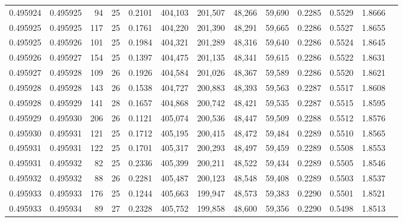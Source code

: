 \begin{tabular}{rrrrrrrrrrrrr}
0.495924 & 0.495925 &  94 &  25 &                                     0.2101 & 404,103 & 201,507 &  48,266 &  59,690 & 0.2285 & 0.5529 & 1.8666 \\
0.495925 & 0.495925 & 117 &  25 &                                     0.1761 & 404,220 & 201,390 &  48,291 &  59,665 & 0.2286 & 0.5527 & 1.8655 \\
0.495925 & 0.495926 & 101 &  25 &                                     0.1984 & 404,321 & 201,289 &  48,316 &  59,640 & 0.2286 & 0.5524 & 1.8645 \\
0.495926 & 0.495927 & 154 &  25 &                                     0.1397 & 404,475 & 201,135 &  48,341 &  59,615 & 0.2286 & 0.5522 & 1.8631 \\
0.495927 & 0.495928 & 109 &  26 &                                     0.1926 & 404,584 & 201,026 &  48,367 &  59,589 & 0.2286 & 0.5520 & 1.8621 \\
0.495928 & 0.495928 & 143 &  26 &                                     0.1538 & 404,727 & 200,883 &  48,393 &  59,563 & 0.2287 & 0.5517 & 1.8608 \\
0.495928 & 0.495929 & 141 &  28 &                                     0.1657 & 404,868 & 200,742 &  48,421 &  59,535 & 0.2287 & 0.5515 & 1.8595 \\
0.495929 & 0.495930 & 206 &  26 &                                     0.1121 & 405,074 & 200,536 &  48,447 &  59,509 & 0.2288 & 0.5512 & 1.8576 \\
0.495930 & 0.495931 & 121 &  25 &                                     0.1712 & 405,195 & 200,415 &  48,472 &  59,484 & 0.2289 & 0.5510 & 1.8565 \\
0.495931 & 0.495931 & 122 &  25 &                                     0.1701 & 405,317 & 200,293 &  48,497 &  59,459 & 0.2289 & 0.5508 & 1.8553 \\
0.495931 & 0.495932 &  82 &  25 &                                     0.2336 & 405,399 & 200,211 &  48,522 &  59,434 & 0.2289 & 0.5505 & 1.8546 \\
0.495932 & 0.495932 &  88 &  26 &                                     0.2281 & 405,487 & 200,123 &  48,548 &  59,408 & 0.2289 & 0.5503 & 1.8537 \\
0.495933 & 0.495933 & 176 &  25 &                                     0.1244 & 405,663 & 199,947 &  48,573 &  59,383 & 0.2290 & 0.5501 & 1.8521 \\
0.495933 & 0.495934 &  89 &  27 &                                     0.2328 & 405,752 & 199,858 &  48,600 &  59,356 & 0.2290 & 0.5498 & 1.8513 \\

\end{tabular}
